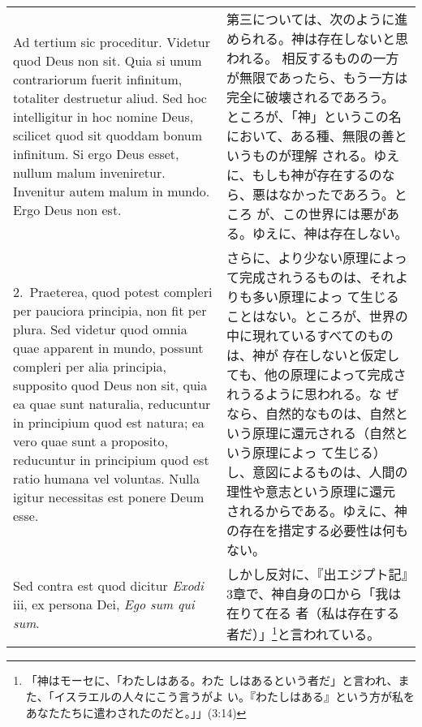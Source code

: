 \documentclass[10pt]{jsarticle} %
\begin{document}
\begin{longtable}{p{21em}p{21em}}




{\Huge A}{\sc d tertium sic proceditur}. Videtur quod Deus
non sit. Quia si unum contrariorum fuerit infinitum, totaliter
destruetur aliud. Sed hoc intelligitur in hoc nomine Deus, scilicet quod
sit quoddam bonum infinitum. Si ergo Deus esset, nullum malum
inveniretur. Invenitur autem malum in mundo. Ergo Deus non est.


&
第三については、次のように進められる。神は存在しないと思われる。
相反するものの一方が無限であったら、もう一方は完全に破壊されるであろう。
 ところが、「神」というこの名において、ある種、無限の善というものが理解
 される。ゆえに、もしも神が存在するのなら、悪はなかったであろう。ところ
 が、この世界には悪がある。ゆえに、神は存在しない。


\\


2.~{\sc  Praeterea}, quod potest compleri per pauciora
principia, non fit per plura. Sed videtur quod omnia quae apparent in
mundo, possunt compleri per alia principia, supposito quod Deus non sit,
quia ea quae sunt naturalia, reducuntur in principium quod est natura;
ea vero quae sunt a proposito, reducuntur in principium quod est ratio
humana vel voluntas. Nulla igitur necessitas est ponere Deum esse.


&
さらに、より少ない原理によって完成されうるものは、それよりも多い原理によっ
 て生じることはない。ところが、世界の中に現れているすべてのものは、神が
 存在しないと仮定しても、他の原理によって完成されうるように思われる。な
 ぜなら、自然的なものは、自然という原理に還元される（自然という原理によっ
 て生じる）し、意図によるものは、人間の理性や意志という原理に還元
 されるからである。ゆえに、神の存在を措定する必要性は何もない。



\\


{\sc Sed contra est} quod dicitur {\it Exodi} {\sc iii}, ex
persona Dei, {\it Ego sum qui sum}.


&

しかし反対に、『出エジプト記』3章で、神自身の口から「我は在りて在る
 者（私は存在する者だ）」\footnote{「神はモーセに、「わたしはある。わた
 しはあるという者だ」と言われ、また、「イスラエルの人々にこう言うがよ
 い。『わたしはある』という方が私をあなたたちに遣わされたのだと。」」(3:14)}と言われている。


\\



\end{longtable}
\end{document}
